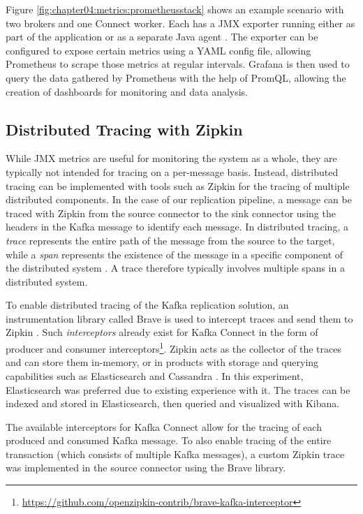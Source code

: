 Figure \ref{fig:chapter04:metrics:prometheusstack} shows an example scenario with two brokers and one Connect worker. Each has a \ac{JMX} exporter running either as part of the application or as a separate Java agent \cite{kafkamonitoringgrafana}. The exporter can be configured to expose certain metrics using a YAML config file, allowing Prometheus to scrape those metrics at regular intervals. Grafana is then used to query the data gathered by Prometheus with the help of \ac{PromQL}, allowing the creation of dashboards for monitoring and data analysis.


\subsection{Distributed Tracing with Zipkin}
While \ac{JMX} metrics are useful for monitoring the system as a whole, they are typically not intended for tracing on a per-message basis. Instead, distributed tracing can be implemented with tools such as Zipkin for the tracing of multiple distributed components. In the case of our replication pipeline, a message can be traced with Zipkin from the source connector to the sink connector using the headers in the Kafka message to identify each message. In distributed tracing, a \textit{trace} represents the entire path of the message from the source to the target, while a \textit{span} represents the existence of the message in a specific component of the distributed system \cite{janes2022zipkin}. A trace therefore typically involves multiple spans in a distributed system.

To enable distributed tracing of the Kafka replication solution, an instrumentation library called Brave is used to intercept traces and send them to Zipkin \cite{mallanna2020distributedzipkin}. Such \textit{interceptors} already exist for Kafka Connect in the form of producer and consumer interceptors\footnote{\url{https://github.com/openzipkin-contrib/brave-kafka-interceptor}}. 
Zipkin acts as the collector of the traces and can store them in-memory, or in products with storage and querying capabilities such as Elasticsearch and Cassandra \cite{mallanna2020distributedzipkin}. In this experiment, Elasticsearch was preferred due to existing experience with it. The traces can be indexed and stored in Elasticsearch, then queried and visualized with Kibana. %

The available interceptors for Kafka Connect allow for the tracing of each produced and consumed Kafka message. To also enable tracing of the entire transaction (which consists of multiple Kafka messages), a custom Zipkin trace was implemented in the source connector using the Brave library.





